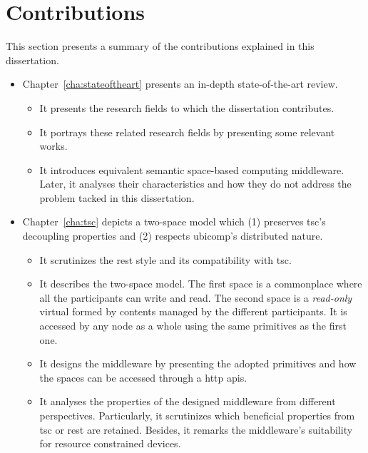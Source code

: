 \section{Contributions}



This section presents a summary of the contributions explained in this dissertation.
\begin{itemize}
  \item Chapter~\ref{cha:stateoftheart} presents an in-depth state-of-the-art review.
    \begin{itemize}
      \item It presents the research fields to which the dissertation contributes.
      \item It portrays these related research fields by presenting some relevant works.
      \item It introduces equivalent semantic space-based computing middleware.
	    Later, it analyses their characteristics and how they do not address the problem tacked in this dissertation.
    \end{itemize}
  
  \item Chapter~\ref{cha:tsc} depicts a two-space model which (1) preserves \ac{tsc}'s decoupling properties and (2) respects \ac{ubicomp}'s distributed nature.
    \begin{itemize}
      \item It scrutinizes the \ac{rest} style and its compatibility with \ac{tsc}.
      \item It describes the two-space model. %
            The first space is a commonplace where all the participants can write and read.
            The second space is a \emph{read-only} virtual \Space{} formed by contents managed by the different participants.
            It is accessed by any node as a whole using the same primitives as the first one.
      \item It designs the middleware by presenting the adopted primitives and how the spaces can be accessed through a \ac{http} \acp{api}.
      \item It analyses the properties of the designed middleware from different perspectives.
	    Particularly, it scrutinizes which beneficial properties from \ac{tsc} or \ac{rest} are retained.
	    Besides, it remarks the middleware's suitability for resource constrained devices.
    \end{itemize}
  

\end{itemize}
